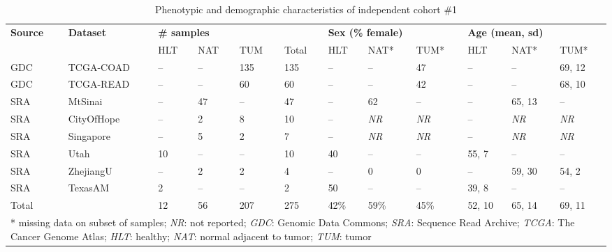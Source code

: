 \begin{table}[ht]
    \small
    \centering
    \caption{Phenotypic and demographic characteristics of independent cohort \#1}
    \label{tab:ind1}
    \begin{tabular}{ll|llll|lll|lll}
        \textbf{Source} & \textbf{Dataset} & \multicolumn{4}{l|}{\textbf{\# samples}} & \multicolumn{3}{l|}{\textbf{Sex (\% female)}} & \multicolumn{3}{l}{\textbf{Age (mean, sd)}} \\
        \cline{3-12}
         & & HLT & NAT & TUM & Total & HLT & NAT* & TUM* & HLT & NAT* & TUM* \\
        \hline
        GDC & TCGA-COAD & -- & -- & 135 & 135 & -- & -- & 47 & -- & -- & 69, 12 \\
        GDC & TCGA-READ & -- & -- & 60 & 60 & -- & -- & 42 & -- & -- & 68, 10 \\
        SRA & MtSinai & -- & 47 & -- & 47 & -- & 62 & -- & -- & 65, 13 & -- \\
        SRA & CityOfHope & -- & 2 & 8 & 10 & -- & \emph{NR} & \emph{NR} & -- & \emph{NR} & \emph{NR} \\
        SRA & Singapore & -- & 5 & 2 & 7 & -- & \emph{NR} & \emph{NR} & -- & \emph{NR} & \emph{NR} \\
        SRA & Utah & 10 & -- & -- & 10 & 40 & -- & -- & 55, 7 & -- & -- \\
        SRA & ZhejiangU & -- & 2 & 2 & 4 & -- & 0 & 0 & -- & 59, 30 & 54, 2 \\
        SRA & TexasAM & 2 & -- & -- & 2 & 50 & -- & -- & 39, 8 & -- & -- \\
        \hline
        Total &  & 12 & 56 & 207 & 275 & 42\% & 59\% & 45\% & 52, 10 & 65, 14 & 69, 11 \\
        \hline
        \multicolumn{12}{l}{* missing data on subset of samples; \emph{NR}: not reported; \emph{GDC}: Genomic Data Commons; \emph{SRA}: Sequence Read Archive; \emph{TCGA}: The Cancer Genome Atlas; \emph{HLT}: healthy; \emph{NAT}: normal adjacent to tumor; \emph{TUM}: tumor} \\
    \end{tabular}
\end{table}
